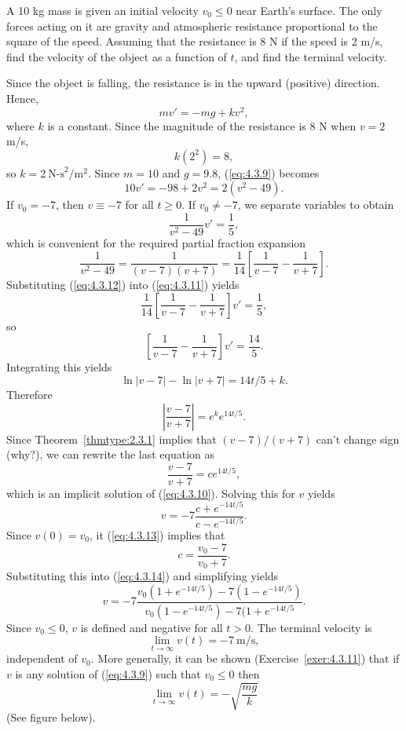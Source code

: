 \documentclass{ximera}
\begin{document}
\begin{example}\label{example:4.3.3}
A 10 kg mass is given an initial velocity $v_0\leq 0$
 near Earth's surface. The only forces acting on it are
gravity and atmospheric resistance proportional to the square of the
speed. Assuming that the resistance is 8 N if the speed is 2 m/s,
find the velocity of the object as a function of $t$, and
find the terminal velocity.

\begin{explanation} Since the object is falling, the resistance is in the upward
(positive) direction. Hence,
\begin{equation} \label{eq:4.3.9}
mv'=-mg+kv^2,
\end{equation}
where $k$ is a constant. Since the magnitude of the resistance is 8 N
when $v=2$ m/s,
$$
k(2^2)=8,
$$
 so $k=2\  \mbox{N-s}^2/\mbox{m}^2$.  Since
$m=10$ and $g=9.8$, (\ref{eq:4.3.9}) becomes
\begin{equation} \label{eq:4.3.10}
10v'=-98+2v^2=2(v^2-49).
\end{equation}
If $v_0=-7$, then $v\equiv-7$ for all $t\geq 0$. If $v_0\neq -7$,
we separate  variables to obtain
\begin{equation} \label{eq:4.3.11}
\frac{1}{v^2-49}v'=\frac{1}{5},
\end{equation}
which is convenient for the required partial fraction expansion
\begin{equation} \label{eq:4.3.12}
\frac{1}{v^2-49} =\frac{1}{(v-7)(v+7)}
=\frac{1}{14}\left[\frac{1}{v-7}
-\frac{1}{v+7}\right].
\end{equation}
 Substituting (\ref{eq:4.3.12})  into (\ref{eq:4.3.11}) yields
$$
\frac{1}{14}\left[\frac{1}{v-7}-\frac{1}{v+7}\right]v'=\frac{1}{5},
$$
 so
$$
\left[\frac{1}{v-7}-\frac{1}{v+7}\right]v'=\frac{14}{5}.
$$
Integrating this yields
$$
\ln |v-7|-\ln|v+7|=14t/5+k.
$$
Therefore
$$
\left|\frac{v-7}{v+7}\right|=e^ke^{14t/5}.
$$
Since  Theorem~\ref{thmtype:2.3.1}  implies  that  $(v-7)/(v+7)$   can't
change sign (why?), we can rewrite the last equation as
 \begin{equation} \label{eq:4.3.13}
 \frac{v-7}{v+7}=ce^{14t/5},
\end{equation}
which is an implicit solution of (\ref{eq:4.3.10}).
Solving this for $v$ yields
\begin{equation} \label{eq:4.3.14}
v=-7\frac{c+e^{-14t/5}}{c-e^{-14t/5}}.
\end{equation}
 Since $v(0)=v_0$, it
 (\ref{eq:4.3.13}) implies that
$$
c=\frac{v_0-7}{v_0+7}.
$$
 Substituting this into (\ref{eq:4.3.14}) and simplifying yields
$$
v=-7\frac{v_0(1+e^{-14t/5})-7(1-e^{-14t/5})}{v_0(1-e^{-14t/5})-7(1+e^{-14t/5}}.
$$
Since $v_0\leq 0$, $v$ is defined and negative for all
$t>0$. The terminal velocity is
$$
\lim_{t\to\infty} v(t)=-7\  \mbox{m/s},
$$
independent of $v_0$. More generally, it
can be shown (Exercise~\ref{exer:4.3.11}) that if $v$ is any solution
of (\ref{eq:4.3.9}) such that $v_0\leq 0$ then
$$
\lim_{t\to\infty}v(t)=-\sqrt{\frac{mg}{k}}
$$
(See figure below).


\end{explanation}
\end{example}
\end{document}
